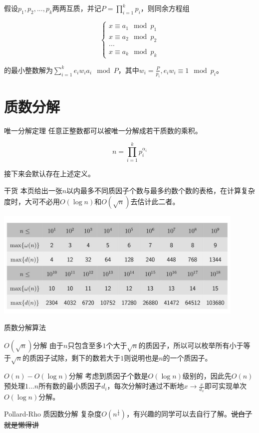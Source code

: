 \documentclass{beamer}
\begin{document}
	\begin{frame}{}
		假设$p_1,p_2,...,p_k$两两互质，并记$P=\prod_{i=1}^kp_i$，则同余方程组
		
		$$\begin{cases}
		x \equiv a_1 \mod p_1\\
		x \equiv a_2 \mod p_2\\
		...\\
		x \equiv a_k \mod p_k
		\end{cases}$$
		
		的最小整数解为$\sum_{i=1}^ke_iw_ia_i \mod P$，其中$w_i=\frac{P}{p_i}, e_iw_i \equiv 1 \mod p_i$。
	\end{frame}
	\section{质数分解}
	\begin{frame}{唯一分解定理}
		任意正整数都可以被唯一分解成若干质数的乘积。
		
		$$n = \prod_{i=1}^k p_i^{\alpha_i}$$
		
		接下来会默认存在上述定义。
		
	\end{frame}
	\begin{frame}{干货}
		本页给出一张$n$以内最多不同质因子个数与最多约数个数的表格，在计算复杂度时，大可不必用$O(\log n)$和$O(\sqrt n)$去估计此二者。
		
		\begin{center}
			\includegraphics[width=12.0cm]{biao.jpg}
		\end{center}
	\end{frame}
	\begin{frame}{质数分解算法}
		\begin{block}{$O(\sqrt n)$分解}
			由于$n$只包含至多$1$个大于$\sqrt n$的质因子，所以可以枚举所有小于等于$\sqrt n$的质因子试除，剩下的数若大于$1$则说明也是$n$的一个质因子。
		\end{block}
		\begin{block}{$O(n)-O(\log n)$分解}
			考虑到质因子个数是$O(\log n)$级别的，因此先$O(n)$预处理$1...n$所有数的最小质因子$d_i$，每次分解时通过不断地$x \to \frac{x}{d_x}$即可实现单次$O(\log n)$分解。
		\end{block}
		\begin{block}{Pollard-Rho 质因数分解}
			复杂度$O(n^{\frac 14})$，有兴趣的同学可以去自行了解。\sout{说白了就是懒得讲}
		\end{block}
	\end{frame}
\end{document}
